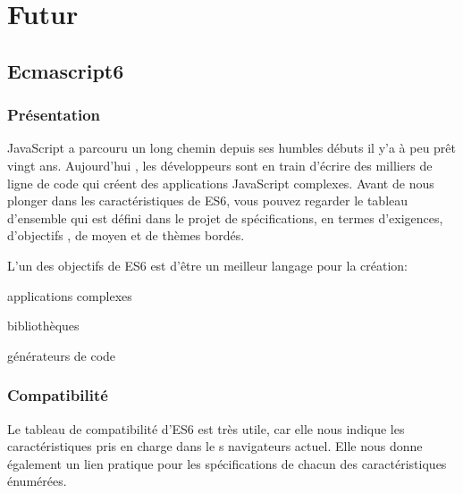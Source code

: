 \chapter{Futur}

\section{Ecmascript6}
\label{ch:ecmascript6}

\subsection{Présentation}


JavaScript a parcouru un long chemin depuis ses humbles débuts il y’a à peu prêt vingt ans. Aujourd’hui , les développeurs sont en train d’écrire des milliers de ligne de code qui créent des applications JavaScript complexes. Avant de nous plonger dans les caractéristiques de ES6, vous pouvez regarder le tableau d’ensemble qui est défini dans le projet de spécifications, en termes d'exigences, d’objectifs , de moyen et de thèmes bordés.

L’un des objectifs de ES6 est d’être un meilleur langage pour la création:


\begin{list}{•}{•}
  \item 
  applications complexes
  \item
  bibliothèques
  \item
  générateurs de code
\end{list}

\subsection {Compatibilité}

Le tableau de compatibilité  d’ES6 est très utile, car elle nous indique les caractéristiques pris en charge dans le s navigateurs actuel. Elle nous donne également un lien pratique pour les spécifications de chacun des caractéristiques énumérées.

